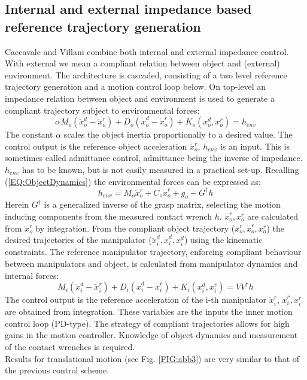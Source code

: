 \documentclass[a4paper,twoside, openright,12pt]{report}
\begin{document}
\subsection{Internal and external impedance based reference trajectory generation}
Caccavale and Villani \cite{Caccavale_01} combine both internal and external impedance control. With external we mean a compliant relation between object and (external) environment. The architecture is cascaded, consisting of a two level reference trajectory generation and a motion control loop below. On top-level an impedance relation between object and environment is used to generate a compliant trajectory subject to environmental forces:
\begin{equation}
\alpha M_o(\ddot{x}_o^d - \ddot{x}_o^r)  + D_o(\dot{x}_o^d - \dot{x}_o^r) + K_o(x_o^d,x_o^r)  = h_{env}
\end{equation}
The constant $ \alpha $ scales the object inertia proportionally to a desired value.
The control output is the reference object acceleration $ \ddot{x}_o^r $, $ h_{env} $ is an input. This is sometimes called admittance control, admittance being the inverse of impedance. $ h_{env} $ has to be known, but is not easily measured in a practical set-up. Recalling (\ref{EQ:ObjectDynamics}) the environmental forces can be expressed as:
\begin{equation}
h_{env} =  M_o \ddot{x}_o^r + C_o \dot{x}_o^r + g_o - G^\dagger h
\end{equation}
Herein $ G^\dagger $ is a generalized inverse of the grasp matrix, selecting the motion inducing components from the measured contact wrench $ h $. $ \dot{x}_o^r, x_o^r $ are calculated from $ \ddot{x}_o^r $ by integration.
From the compliant object trajectory ($ \ddot{x}_o^r,\dot{x}_o^r,x_o^r $) the desired trajectories of the manipulator ($ \ddot{x}_i^d,\dot{x}_i^d,x_i^d $) using the kinematic constraints. The reference manipulator trajectory, enforcing compliant behaviour between manipulators and object, is calculated from manipulator dynamics and internal forces: 
\begin{equation}
M_i(\ddot{x}_i^d - \ddot{x}_i^r) + D_i (\dot{x}_i^d - \dot{x}_i^r) + K_i(x_i^d,x_i^r) = VV^\dagger h
\end{equation}
The control output is the reference acceleration of the i-th manipulator $ \ddot{x}_i^r $, $ \dot{x}_i^r,x_i^r $ are obtained from integration. These variables are the inputs the inner motion control loop (PD-type). The strategy of compliant trajectories allows for high gains in the motion controller. Knowledge of object dynamics and measurement of the contact wrenches is required.\\
Results for translational motion (see Fig. \ref{FIG:abb3}) are very similar to that of the previous control scheme.
\end{document}

